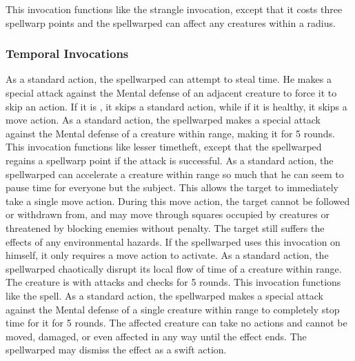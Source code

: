 This invocation functions like the strangle invocation, except that it costs three spellwarp points and the spellwarped can affect any creatures within a \areasmall radius.

\subsubsection{Temporal Invocations}
As a standard action, the spellwarped can attempt to steal time.
He makes a special attack against the Mental defense of an adjacent creature to force it to skip an action.
If it is \bloodied, it skips a standard action, while if it is healthy, it skips a move action.
As a standard action, the spellwarped makes a special attack against the Mental defense of a creature within \rngclose range, making it \slowed for 5 rounds.
This invocation functions like lesser timetheft, except that the spellwarped regains a spellwarp point if the attack is successful.
As a standard action, the spellwarped can accelerate a creature within \rngclose range so much that he can seem to pause time for everyone but the subject.
This allows the target to immediately take a single move action.
During this move action, the target cannot be followed or withdrawn from, and may move through squares occupied by creatures or threatened by blocking enemies without penalty.
The target still suffers the effects of any environmental hazards.
If the spellwarped uses this invocation on himself, it only requires a move action to activate.
As a standard action, the spellwarped chaotically disrupt its local flow of time of a creature within \rngmed range.
The creature is \impaired with attacks and checks for 5 rounds.
 This invocation functions like the  spell.
As a standard action, the spellwarped makes a special attack against the Mental defense of a single creature within \rngclose range to completely stop time for it for 5 rounds.
The affected creature can take no actions and cannot be moved, damaged, or even affected in any way until the effect ends.
The spellwarped may dismiss the effect as a swift action.

